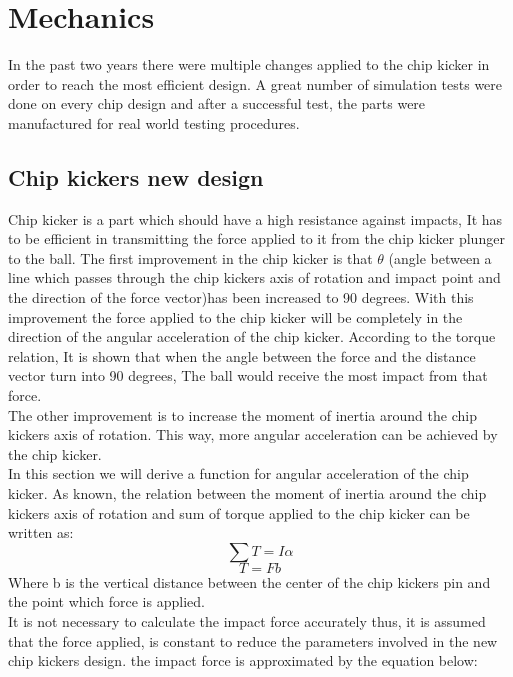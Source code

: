 \section{Mechanics}
\setlength\intextsep{0pt}
In the past two years there were multiple changes applied to the chip kicker in order to reach the most efficient design. A great number of simulation tests were done on every chip design and after a successful test, the parts were manufactured for real world testing procedures.

\subsection{Chip kickers new design}
Chip kicker is a part which should have a high resistance against impacts, It has to be efficient in transmitting the force applied to it from the chip kicker plunger to the ball. The first improvement in the chip kicker is that $\theta$ (angle between a line which passes through the chip kickers axis of rotation and impact point and the direction of the force vector)has been increased to 90 degrees. With this improvement the force applied to the chip kicker will be completely in the direction of the angular acceleration of the chip kicker. According to the torque relation, It is shown that when the angle between the force and the distance vector turn into 90 degrees, The ball would receive the most impact from that force.\\
The other improvement is to increase the moment of inertia around the chip kickers axis of rotation. This way, more angular acceleration can be achieved by the chip kicker.\\
In this section we will derive a function for angular acceleration of the chip kicker. As known, the relation between the moment of inertia around the chip kickers axis of rotation and sum of torque applied to the chip kicker can be written as:
\begin{equation}
\sum T=I\alpha
\end{equation}
\begin{equation}
T=Fb
\end{equation}
Where b is the vertical distance between the center of the chip kickers pin and the point which force is applied.\\
It is not necessary to calculate the impact force accurately thus, it is assumed that the force applied, is constant to reduce the parameters involved in the new chip kickers design. the impact force is approximated by the equation below:
